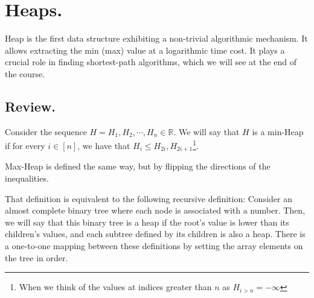 


\ifdefined\BOOK
\else
\setcounter{chapter}{5}
\fi

\chapter{Heaps.} 
Heap is the first data structure exhibiting a non-trivial algorithmic mechanism. It allows extracting the min (max) value at a logarithmic time cost. It plays a crucial role in finding shortest-path algorithms, which we will see at the end of the course.

\section{Review.}
  \begin{definition}    
    Consider the sequence $H = H_{1}, H_{2}, \cdots, H_{n} \in \mathbb{R}$. We will say that $H$ is a min-Heap if for every $i \in [n]$, we have that $H_{i} \le H_{2i}, H_{2i + 1}$\footnote{When we think of the values at indices greater than $n$ as $H_{i>n} = -\infty$}.


Max-Heap is defined the same way, but by flipping the directions of the inequalities.
  \end{definition}

That definition is equivalent to the following recursive definition: Consider an almost complete binary tree where each node is associated with a number. Then, we will say that this binary tree is a heap if the root's value is lower than its children's values, and each subtree defined by its children is also a heap. There is a one-to-one mapping between these definitions by setting the array elements on the tree in order.


